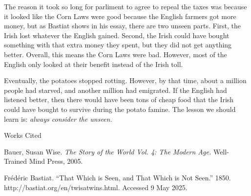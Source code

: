 \documentclass[12pt]{article}
\newcommand{\bibent}{\noindent \hangindent 40pt}
\newenvironment{workscited}{\newpage \begin{center} Works Cited \end{center}}{\newpage }
\begin{document}
\begin{flushleft}
The reason it took so long for parliment to agree to repeal the taxes
was because it looked like the Corn Laws were good because the English
farmers got more money, but as Bastiat shows in his essay, there are two
unseen parts. First, the Irish lost whatever the English gained.
Second, the Irish could have bought something with that extra money
they spent, but they did not get anything better. Overall, this means
the Corn Laws were bad. However, most of the English only looked at
their benefit instead of the Irish toll.

Eventually, the potatoes stopped rotting. However, by that time, about
a million people had starved, and another million had emigrated. If
the English had listened better, then there would have been tons of
cheap food that the Irish could have bought to survive during the
potato famine. The lesson we should learn is: \textit{always consider the
unseen.}
\begin{workscited}

\bibent
Bauer, Susan Wise. \textit{The Story of the World Vol. 4: The Modern Age.} Well-Trained Mind Press, 2005.

\bibent
Frédéric Bastiat. ``That Which is Seen, and That Which is Not Seen.'' 1850. http://bastiat.org/en/twisatwins.html. Accessed 9 May 2025.



\end{workscited}

\end{flushleft}
\end{document}
